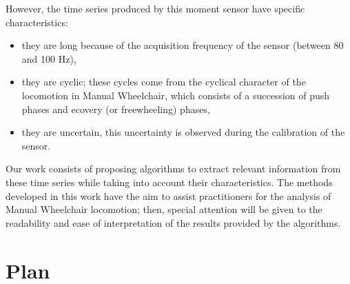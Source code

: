 However, the time series produced by this moment sensor have specific characteristics: 
\begin{itemize}
\item they are long because of the acquisition frequency of the sensor (between 80 and 100 Hz),
\item they are cyclic; these cycles come from the cyclical character of the locomotion in Manual Wheelchair, which consists of a succession of push phases and ecovery (or freewheeling) phases,
\item they are uncertain, this uncertainty is observed during the calibration of the sensor.
\end{itemize}
  

Our work consists of proposing algorithms to extract relevant information from these time series while taking into account their characteristics. The methods developed in this work have the aim to assist practitioners for the analysis of Manual Wheelchair locomotion; then, special attention will be given to the readability and ease of interpretation of the results provided by the  algorithms.


\section*{Plan}


